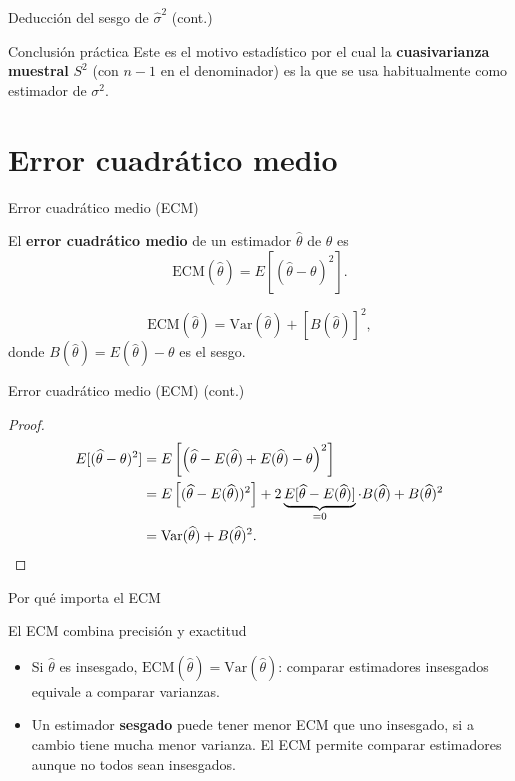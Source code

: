 \documentclass[aspectratio=169,11pt]{beamer}
\begin{document}
\begin{frame}{Deducción del sesgo de $\widehat\sigma^2$ (cont.)}
\begin{block}{Conclusión práctica}
Este es el motivo estadístico por el cual la \textbf{cuasivarianza muestral} $S^2$ (con $n-1$ en el denominador) es la que se usa habitualmente como estimador de $\sigma^2$.
\end{block}
\end{frame}

\section{Error cuadrático medio}

\begin{frame}{Error cuadrático medio (ECM)}
\begin{definition}[ECM]
El \textbf{error cuadrático medio} de un estimador $\widehat\theta$ de $\theta$ es
\[
\mathrm{ECM}(\widehat\theta) = E\left[(\widehat\theta - \theta)^2\right].
\]
\end{definition}

\begin{theorem}
\[
\mathrm{ECM}(\widehat\theta) = \mathrm{Var}(\widehat\theta) + \left[B(\widehat\theta)\right]^2,
\]
donde $B(\widehat\theta) = E(\widehat\theta)-\theta$ es el sesgo.
\end{theorem}

\end{frame}

\begin{frame}{Error cuadrático medio (ECM) (cont.)}
\begin{proof}
\begin{align*}
E[(\widehat\theta-\theta)^2] &= E\left[\left(\widehat\theta - E(\widehat\theta) + E(\widehat\theta) - \theta\right)^2\right] \\
&= E\left[(\widehat\theta-E(\widehat\theta))^2\right] + 2\underbrace{E[\widehat\theta - E(\widehat\theta)]}_{=0}\cdot B(\widehat\theta) + B(\widehat\theta)^2 \\
&= \mathrm{Var}(\widehat\theta) + B(\widehat\theta)^2. \qedhere
\end{align*}
\end{proof}
\end{frame}

\begin{frame}{Por qué importa el ECM}
\begin{block}{El ECM combina precisión y exactitud}
\begin{itemize}
\item Si $\widehat\theta$ es insesgado, $\mathrm{ECM}(\widehat\theta) = \mathrm{Var}(\widehat\theta)$: comparar estimadores insesgados equivale a comparar varianzas.
\item Un estimador \textbf{sesgado} puede tener menor ECM que uno insesgado, si a cambio tiene mucha menor varianza. El ECM permite comparar estimadores aunque no todos sean insesgados.
\end{itemize}
\end{block}

\end{frame}
\end{document}
